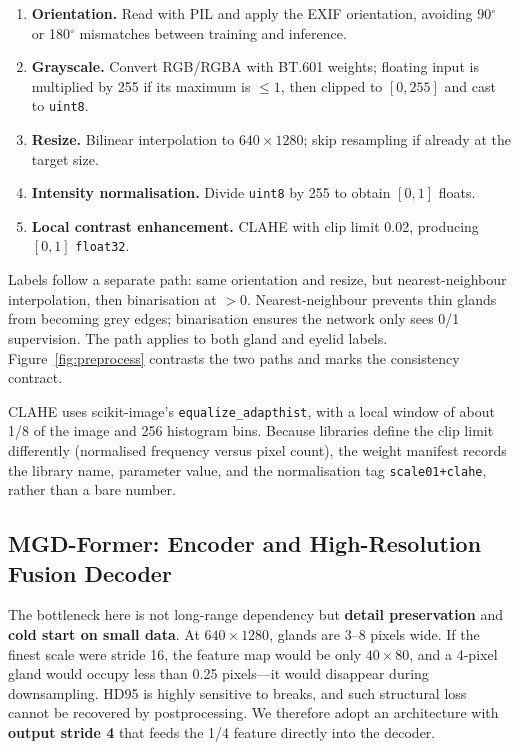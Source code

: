\begin{enumerate}[label=\textbf{P\arabic*.}]
\item \textbf{Orientation.} Read with PIL and apply the EXIF orientation, avoiding 90$^\circ$ or 180$^\circ$ mismatches between training and inference.
\item \textbf{Grayscale.} Convert RGB/RGBA with BT.601 weights; floating input is multiplied by 255 if its maximum is $\le 1$, then clipped to $[0,255]$ and cast to \texttt{uint8}.
\item \textbf{Resize.} Bilinear interpolation to $640\times1280$; skip resampling if already at the target size.
\item \textbf{Intensity normalisation.} Divide \texttt{uint8} by 255 to obtain $[0,1]$ floats.
\item \textbf{Local contrast enhancement.} CLAHE with clip limit 0.02, producing $[0,1]$ \texttt{float32}.
\end{enumerate}

Labels follow a separate path: same orientation and resize, but nearest-neighbour interpolation, then binarisation at $>0$. Nearest-neighbour prevents thin glands from becoming grey edges; binarisation ensures the network only sees 0/1 supervision. The path applies to both gland and eyelid labels. Figure~\ref{fig:preprocess} contrasts the two paths and marks the consistency contract.



CLAHE uses scikit-image's \texttt{equalize\_adapthist}, with a local window of about 1/8 of the image and 256 histogram bins. Because libraries define the clip limit differently (normalised frequency versus pixel count), the weight manifest records the library name, parameter value, and the normalisation tag \texttt{scale01+clahe}, rather than a bare number.

\subsection{MGD-Former: Encoder and High-Resolution Fusion Decoder}\label{sec:mgdformer}

The bottleneck here is not long-range dependency but \textbf{detail preservation} and \textbf{cold start on small data}. At $640\times1280$, glands are 3--8 pixels wide. If the finest scale were stride 16, the feature map would be only $40\times80$, and a 4-pixel gland would occupy less than 0.25 pixels---it would disappear during downsampling. HD95 is highly sensitive to breaks, and such structural loss cannot be recovered by postprocessing. We therefore adopt an architecture with \textbf{output stride 4} that feeds the 1/4 feature directly into the decoder.

